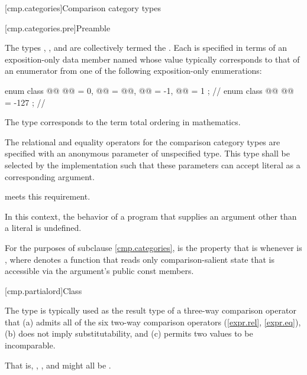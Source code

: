[cmp.categories]{Comparison category types}

[cmp.categories.pre]{Preamble}

\pnum
The types
,
, and
are collectively termed the .
Each is specified in terms of an exposition-only data member named 
whose value typically corresponds to that of an enumerator
from one of the following exposition-only enumerations:

\begin{codeblock}
enum class @@ { @@ = 0, @@ = @@, @@ = -1, @@ = 1 }; // \expos
enum class @@ { @@ = -127 };                                     // \expos
\end{codeblock}

\pnum
\begin{note}
The type 
corresponds to the term
total ordering in mathematics.
\end{note}

\pnum
The relational and equality operators for the comparison category types
are specified with an anonymous parameter of unspecified type.
This type shall be selected by the implementation such that
these parameters can accept literal  as a corresponding argument.
\begin{example}
meets this requirement.
\end{example}
In this context, the behavior of a program that supplies
an argument other than a literal  is undefined.

\pnum
For the purposes of subclause \ref{cmp.categories},
 is the property that  is 
whenever  is ,
where  denotes a function that reads only comparison-salient state
that is accessible via the argument's public const members.

[cmp.partialord]{Class }

\pnum
The  type is typically used
as the result type of a three-way comparison operator
that (a) admits all of the six two-way comparison operators (\ref{expr.rel}, \ref{expr.eq}),
(b) does not imply substitutability,
and (c) permits two values to be incomparable.
\begin{footnote}
That is, , , and  might all be .
\end{footnote}

